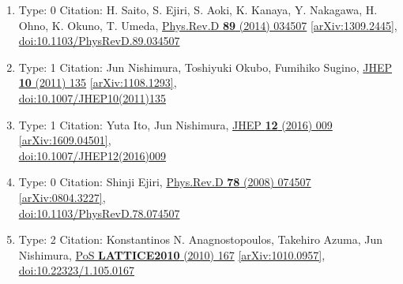 \documentclass[a4paper,10pt]{article}
\begin{document}
\begin{enumerate}
\begin{enumerate}
  \item Type: 0 Citation: H. Saito, S. Ejiri, S. Aoki, K. Kanaya, Y. Nakagawa, H. Ohno, K. Okuno, T. Umeda, \href{https://www.doi.org/10.1103/PhysRevD.89.034507}{Phys.Rev.D {\bf 89} (2014) 034507}  \href{https://arxiv.org/abs/1309.2445}{[arXiv:1309.2445]},\\\href{https://www.doi.org/10.1103/PhysRevD.89.034507}{doi:10.1103/PhysRevD.89.034507}
  \item Type: 1 Citation: Jun Nishimura, Toshiyuki Okubo, Fumihiko Sugino, \href{https://www.doi.org/10.1007/JHEP10(2011)135}{JHEP {\bf 10} (2011) 135}  \href{https://arxiv.org/abs/1108.1293}{[arXiv:1108.1293]},\\\href{https://www.doi.org/10.1007/JHEP10(2011)135}{doi:10.1007/JHEP10(2011)135}
  \item Type: 1 Citation: Yuta Ito, Jun Nishimura, \href{https://www.doi.org/10.1007/JHEP12(2016)009}{JHEP {\bf 12} (2016) 009}  \href{https://arxiv.org/abs/1609.04501}{[arXiv:1609.04501]},\\\href{https://www.doi.org/10.1007/JHEP12(2016)009}{doi:10.1007/JHEP12(2016)009}
  \item Type: 0 Citation: Shinji Ejiri, \href{https://www.doi.org/10.1103/PhysRevD.78.074507}{Phys.Rev.D {\bf 78} (2008) 074507}  \href{https://arxiv.org/abs/0804.3227}{[arXiv:0804.3227]},\\\href{https://www.doi.org/10.1103/PhysRevD.78.074507}{doi:10.1103/PhysRevD.78.074507}
  \item Type: 2 Citation: Konstantinos N. Anagnostopoulos, Takehiro Azuma, Jun Nishimura, \href{https://www.doi.org/10.22323/1.105.0167}{PoS {\bf LATTICE2010} (2010) 167}  \href{https://arxiv.org/abs/1010.0957}{[arXiv:1010.0957]},\\\href{https://www.doi.org/10.22323/1.105.0167}{doi:10.22323/1.105.0167}

\end{enumerate}
\end{enumerate}
\end{document}
